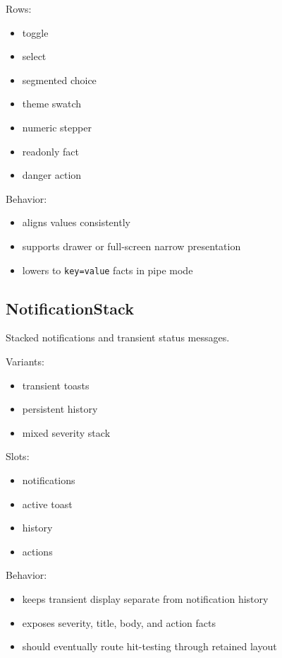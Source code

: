 Rows:

\begin{itemize}
\tightlist
\item
  toggle
\item
  select
\item
  segmented choice
\item
  theme swatch
\item
  numeric stepper
\item
  readonly fact
\item
  danger action
\end{itemize}

Behavior:

\begin{itemize}
\tightlist
\item
  aligns values consistently
\item
  supports drawer or full-screen narrow presentation
\item
  lowers to \texttt{k\allowbreak{}e\allowbreak{}y\allowbreak{}=\allowbreak{}v\allowbreak{}a\allowbreak{}l\allowbreak{}u\allowbreak{}e} facts in pipe mode
\end{itemize}

\subsection{NotificationStack}\label{record-128-notificationstack}

Stacked notifications and transient status messages.

Variants:

\begin{itemize}
\tightlist
\item
  transient toasts
\item
  persistent history
\item
  mixed severity stack
\end{itemize}

Slots:

\begin{itemize}
\tightlist
\item
  notifications
\item
  active toast
\item
  history
\item
  actions
\end{itemize}

Behavior:

\begin{itemize}
\tightlist
\item
  keeps transient display separate from notification history
\item
  exposes severity, title, body, and action facts
\item
  should eventually route hit-testing through retained layout
\end{itemize}

